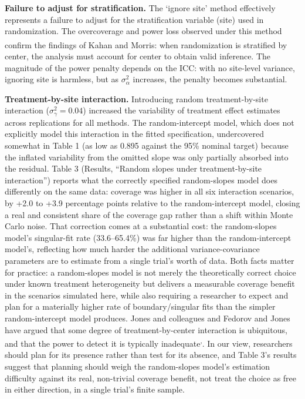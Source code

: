 \documentclass[
  11pt,
]{article}
\begin{document}
\textbf{Failure to adjust for stratification.} The `ignore
site' method effectively represents a failure to adjust
for the stratification variable (site) used in
randomization. The overcoverage and power loss observed
under this method confirm the findings of Kahan and Morris\textsuperscript{}: when randomization is
stratified by center, the analysis must account for
center to obtain valid inference. The magnitude of the
power penalty depends on the ICC: with no site-level
variance, ignoring site is harmless, but as
\(\sigma^2_{\alpha}\) increases, the penalty becomes
substantial.

\textbf{Treatment-by-site interaction.} Introducing random
treatment-by-site interaction (\(\sigma^2_{\gamma} = 0.04\))
increased the variability of treatment effect estimates
across replications for all methods. The random-intercept
model, which does not explicitly model this interaction in
the fitted specification, undercovered somewhat in Table 1
(as low as 0.895 against the
95\% nominal target) because the inflated variability from the
omitted slope was only partially absorbed into the residual.
Table 3 (Results, ``Random slopes under treatment-by-site
interaction'') reports what the correctly specified
random-slopes model does differently on the same data:
coverage was higher in all six interaction scenarios, by
+2.0 to
+3.9 percentage points
relative to the random-intercept model, closing a real and
consistent share of the coverage gap rather than a shift within
Monte Carlo noise. That correction comes at a substantial cost:
the random-slopes model's
singular-fit rate
(33.6--65.4\%)
was far higher than the random-intercept model's, reflecting how
much harder the additional variance-covariance parameters are to
estimate from a single trial's worth of data. Both facts matter
for practice: a random-slopes model is not merely the
theoretically correct choice under known treatment heterogeneity
but delivers a measurable coverage benefit in the scenarios
simulated here, while also requiring a researcher to expect and
plan for a materially higher rate of boundary/singular fits than
the simpler random-intercept model produces. Jones and colleagues
and Fedorov and Jones have argued that some degree of
treatment-by-center interaction is ubiquitous, and that the
power to detect it is typically inadequate\textsuperscript{,}. In our view,
researchers should plan for its presence rather than test for
its absence, and Table 3's results suggest that planning
should weigh the random-slopes model's estimation difficulty
against its real, non-trivial coverage benefit, not treat the
choice as free in either direction, in a single trial's
finite sample.
\end{document}
